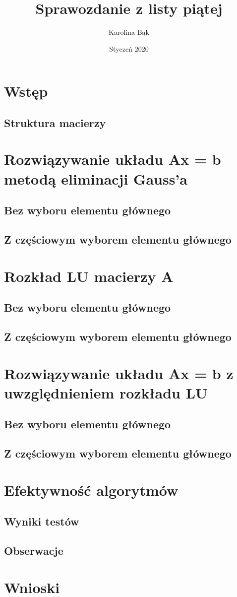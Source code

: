 \documentclass{article}
\title{Sprawozdanie z listy piątej}
\author{Karolina Bąk}
\date{Styczeń 2020}
\begin{document}
\maketitle

\section{Wstęp}
\subsection{Struktura macierzy}
\section{Rozwiązywanie układu Ax = b metodą eliminacji Gauss'a}
\subsection{Bez wyboru elementu głównego}
\subsection{Z częściowym wyborem elementu głównego}
\section{Rozkład LU macierzy A}
\subsection{Bez wyboru elementu głównego}
\subsection{Z częściowym wyborem elementu głównego}
\section{Rozwiązywanie układu Ax = b z uwzględnieniem rozkładu LU}
\subsection{Bez wyboru elementu głównego}
\subsection{Z częściowym wyborem elementu głównego}
\section{Efektywność algorytmów}
\subsection{Wyniki testów}
\subsection{Obserwacje}
\section{Wnioski}
\end{document}
